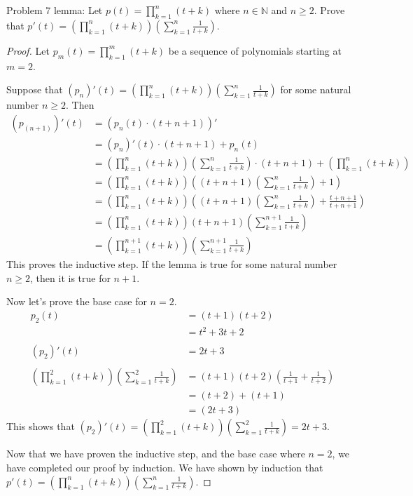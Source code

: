 \usepackage{amsthm}

Problem 7 lemma: Let $\displaystyle p(t) = \prod_{k=1}^{n} (t+k)$ where $n \in \mathbb{N}$ and $n \geq 2$. Prove that $\displaystyle p'(t) = \left( \prod_{k=1}^{n} (t+k) \right) \left( \sum_{k=1}^{n} \frac{1}{t + k} \right)$.

\begin{proof}
Let $\displaystyle p_{m}(t) = \prod_{k=1}^{m} (t+k)$ be a sequence of polynomials starting at $m = 2$. 

Suppose that $\displaystyle (p_{n})'(t) = \left( \prod_{k=1}^{n} (t+k) \right) \left( \sum_{k=1}^{n} \frac{1}{t + k} \right)$ for some natural number $n \geq 2$. Then
\begin{align*}
(p_{(n+1)})'(t) &= \left( p_{n}(t) \cdot (t + n + 1) \right)' \\
&= (p_{n})'(t) \cdot (t + n + 1) + p_{n}(t) \\
&= \left( \prod_{k=1}^{n} (t+k) \right) \left( \sum_{k=1}^{n} \frac{1}{t + k} \right) \cdot (t + n + 1) + \left( \prod_{k=1}^{n} (t+k) \right) \\
&= \left( \prod_{k=1}^{n} (t+k) \right) \left( (t + n + 1) \left( \sum_{k=1}^{n} \frac{1}{t + k} \right) + 1 \right) \\
&= \left( \prod_{k=1}^{n} (t+k) \right) \left( (t + n + 1) \left( \sum_{k=1}^{n} \frac{1}{t + k} \right) + \frac{t + n + 1}{t + n + 1} \right) \\
&= \left( \prod_{k=1}^{n} (t+k) \right) (t + n + 1) \left( \sum_{k=1}^{n+1} \frac{1}{t + k} \right) \\
&= \left( \prod_{k=1}^{n+1} (t+k) \right) \left( \sum_{k=1}^{n+1} \frac{1}{t + k} \right)
\end{align*}
This proves the inductive step. If the lemma is true for some natural number $n \geq 2$, then it is true for $n + 1$.

Now let's prove the base case for $n = 2$.
\begin{align*}
p_{2}(t) &= (t + 1)(t + 2) \\
&= t^2 + 3t + 2 \\ \\
(p_{2})'(t) &= 2t + 3 \\ \\
\left( \prod_{k=1}^{2} (t+k) \right) \left( \sum_{k=1}^{2} \frac{1}{t + k} \right) &= (t + 1)(t + 2)\left(\frac{1}{t + 1} + \frac{1}{t + 2}\right) \\
&= (t + 2) + (t + 1) \\
&= (2t + 3)
\end{align*}
This shows that $\displaystyle (p_{2})'(t) = \left( \prod_{k=1}^{2} (t+k) \right) \left( \sum_{k=1}^{2} \frac{1}{t + k} \right) = 2t + 3$.

Now that we have proven the inductive step, and the base case where $n = 2$, we have completed our proof by induction. We have shown by induction that $\displaystyle p'(t) = \left( \prod_{k=1}^{n} (t+k) \right) \left( \sum_{k=1}^{n} \frac{1}{t + k} \right)$.

\end{proof}
